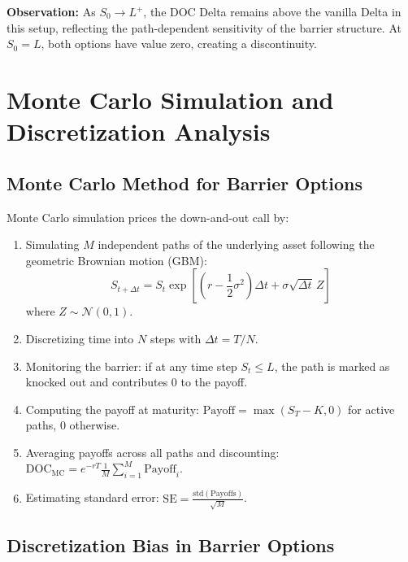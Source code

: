 \documentclass{report}
\begin{document}
\textbf{Observation:} As $S_0 \to L^+$, the DOC Delta remains above the vanilla Delta in this setup, reflecting the path-dependent sensitivity of the barrier structure. At $S_0 = L$, both options have value zero, creating a discontinuity.

\section{Monte Carlo Simulation and Discretization Analysis}

\subsection{Monte Carlo Method for Barrier Options}

Monte Carlo simulation prices the down-and-out call by:
\begin{enumerate}
    \item Simulating $M$ independent paths of the underlying asset following the geometric Brownian motion (GBM):
    $$S_{t+\Delta t} = S_t \exp\left[\left(r - \frac{1}{2}\sigma^2\right)\Delta t + \sigma\sqrt{\Delta t} \, Z\right]$$
    where $Z \sim \mathcal{N}(0,1)$.
    
    \item Discretizing time into $N$ steps with $\Delta t = T/N$.
    
    \item Monitoring the barrier: if at any time step $S_t \le L$, the path is marked as knocked out and contributes 0 to the payoff.
    
    \item Computing the payoff at maturity: $\text{Payoff} = \max(S_T - K, 0)$ for active paths, 0 otherwise.
    
    \item Averaging payoffs across all paths and discounting: $\text{DOC}_{\text{MC}} = e^{-rT} \frac{1}{M} \sum_{i=1}^M \text{Payoff}_i$.
    
    \item Estimating standard error: $\text{SE} = \frac{\text{std}(\text{Payoffs})}{\sqrt{M}}$.
\end{enumerate}

\subsection{Discretization Bias in Barrier Options}
\end{document}
